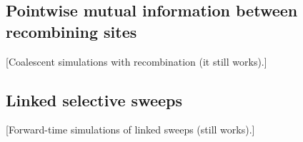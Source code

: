 \documentclass[11pt, letterpaper]{article}   	%
\newcommand{\E}[1]{\left< #1 \right>}
\begin{document}
%
%
%

\subsection*{Pointwise mutual information between recombining sites}
[Coalescent simulations with recombination (it still works).]

\subsection*{Linked selective sweeps}
[Forward-time simulations of linked sweeps (still works).]
\end{document}
